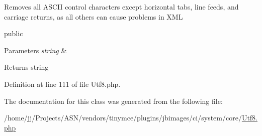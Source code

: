 Removes all A\+S\+C\+II control characters except horizontal tabs, line feeds, and carriage returns, as all others can cause problems in X\+ML

public 
\begin{DoxyParams}{Parameters}
{\em string} & \\
\hline
\end{DoxyParams}
\begin{DoxyReturn}{Returns}
string 
\end{DoxyReturn}


Definition at line 111 of file Utf8.\+php.



The documentation for this class was generated from the following file\+:\begin{DoxyCompactItemize}
\item 
/home/jj/\+Projects/\+A\+S\+N/vendors/tinymce/plugins/jbimages/ci/system/core/\hyperlink{_utf8_8php}{Utf8.\+php}\end{DoxyCompactItemize}
